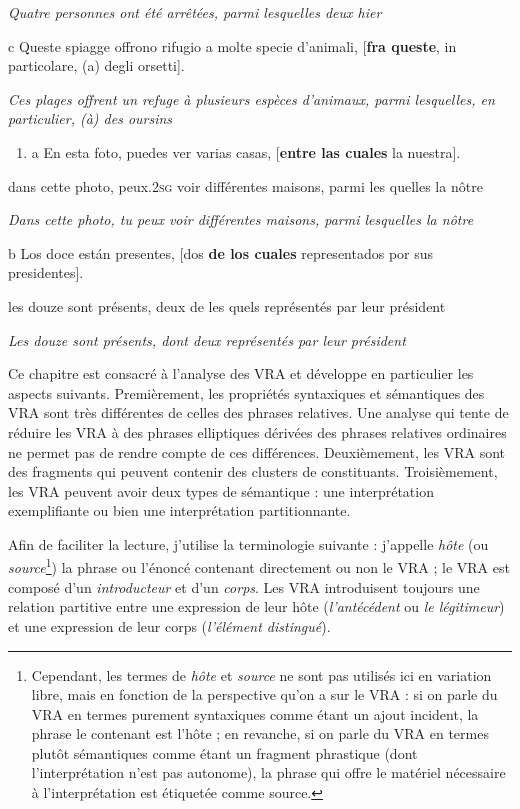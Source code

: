 {\itshape
Quatre personnes ont été arrêtées, parmi lesquelles deux hier}

  c  Queste spiagge offrono rifugio a molte specie d'animali, [\textbf{fra queste}, in particolare, (a) degli orsetti].

{\itshape
Ces plages offrent un refuge à plusieurs espèces d'animaux, parmi lesquelles, en particulier, (à) des oursins}


\begin{enumerate}
\item \label{bkm:Ref292827461}a  En esta foto, puedes ver varias casas, [\textbf{entre las cuales} la nuestra]. 


\end{enumerate}
dans cette photo, peux.2\textsc{sg} voir différentes maisons, parmi les quelles la nôtre

{\itshape
Dans cette photo, tu peux voir différentes maisons, parmi lesquelles la nôtre}

  b  Los doce est\'an presentes, [dos \textbf{de los cuales} representados por sus presidentes].

    les douze sont présents, deux de les quels représentés par leur président

{\itshape
Les douze sont présents, dont deux représentés par leur président} 

Ce chapitre est consacré à l'analyse des VRA et développe en particulier les aspects suivants. Premièrement, les propriétés syntaxiques et sémantiques des VRA sont très différentes de celles des phrases relatives. Une analyse qui tente de réduire les VRA à des phrases elliptiques dérivées des phrases relatives ordinaires ne permet pas de rendre compte de ces différences. Deuxièmement, les VRA sont des fragments qui peuvent contenir des clusters de constituants. Troisièmement, les VRA peuvent avoir deux types de sémantique : une interprétation exemplifiante ou bien une interprétation partitionnante.

Afin de faciliter la lecture, j'utilise la terminologie suivante : j'appelle \textit{hôte} (ou \textit{source}\footnote{Cependant, les termes de \textit{hôte} et \textit{source} ne sont pas utilisés ici en variation libre, mais en fonction de la perspective qu'on a sur le VRA : si on parle du VRA en termes purement syntaxiques comme étant un ajout incident, la phrase le contenant est l'hôte ; en revanche, si on parle du VRA en termes plutôt sémantiques comme étant un fragment phrastique (dont l'interprétation n'est pas autonome), la phrase qui offre le matériel nécessaire à l'interprétation est étiquetée comme source.})  la phrase ou l'énoncé contenant directement ou non le VRA ; le VRA est composé d'un \textit{introducteur} et d'un \textit{corps}. Les VRA introduisent toujours une relation partitive entre une expression de leur hôte (\textit{l'antécédent} ou \textit{le légitimeur}) et une expression de leur corps (\textit{l'élément distingué}).


